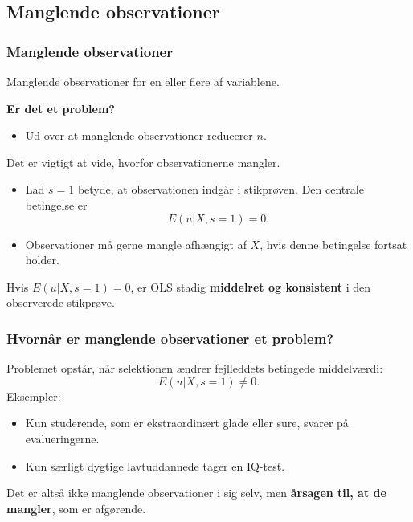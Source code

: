 \documentclass[aspectratio=43,t]{beamer}
\begin{document}
\subsection{Manglende observationer}


\begin{frame}
\frametitle{Manglende observationer}

	Manglende observationer for en eller flere af variablene. 
	
	\textbf{Er det et problem?}
	\begin{itemize}
	\item Ud over at manglende observationer reducerer $n$.
	\end{itemize}
	Det er vigtigt at vide, hvorfor observationerne mangler.
	\begin{itemize}
	\item Lad $s=1$ betyde, at observationen indgår i stikprøven. Den centrale betingelse er
	\begin{equation*}
	E(u|X,s=1)=0.
	\end{equation*}
	\item Observationer må gerne mangle afhængigt af $X$, hvis denne betingelse fortsat holder.
	\end{itemize}
	Hvis $E(u|X,s=1)=0$, er OLS stadig \textbf{middelret og konsistent} i den observerede stikprøve.

\end{frame}


\begin{frame}
\frametitle{Hvornår er manglende observationer et problem?}

	Problemet opstår, når selektionen ændrer fejlleddets betingede middelværdi:
	\begin{equation*}
	E(u|X,s=1)\neq0.
	\end{equation*}
	Eksempler:
	\begin{itemize}
		\item Kun studerende, som er ekstraordinært glade eller sure, svarer på evalueringerne.
		\item Kun særligt dygtige lavtuddannede tager en IQ-test.
	\end{itemize}
	Det er altså ikke manglende observationer i sig selv, men \textbf{årsagen til, at de mangler}, som er afgørende.

\end{frame}
\end{document}
